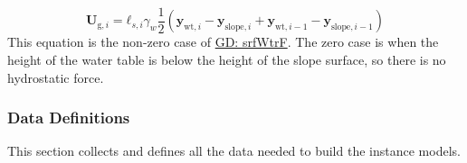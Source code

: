 \documentclass[12pt]{article}
\begin{document}
\begin{displaymath}
{\mathbf{U}_{\text{g},i}}={\mathbf{ℓ}_{s,i}} {γ_{w}} \frac{1}{2} \left({\mathbf{y}_{\text{wt},i}}-{\mathbf{y}_{\text{slope},i}}+{\mathbf{y}_{\text{wt},i-1}}-{\mathbf{y}_{\text{slope},i-1}}\right)
\end{displaymath}
This equation is the non-zero case of \hyperref[GD:srfWtrF]{GD: srfWtrF}. The zero case is when the height of the water table is below the height of the slope surface, so there is no hydrostatic force.

\subsubsection{Data Definitions}
\label{Sec:DDs}
This section collects and defines all the data needed to build the instance models.
\end{document}

